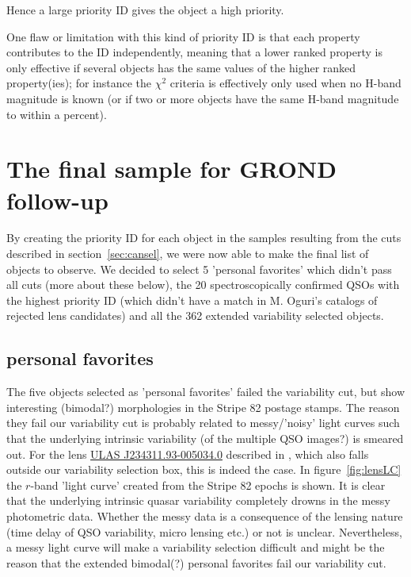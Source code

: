 \documentclass[a4paper,11pt]{article}
\begin{document}
Hence a large priority ID gives the object a high priority.

One flaw or limitation with this kind of priority ID is that each property
contributes to the ID independently, meaning that a lower ranked property is
only effective if several objects has the same values of the higher ranked
property(ies); for instance the $\chi^2$ criteria is effectively only used
when no H-band magnitude is known (or if two or more objects have the same
H-band magnitude to within a percent).

\section{The final sample for GROND follow-up}

By creating the priority ID for each object in the samples resulting from the cuts described in section~\ref{sec:cansel}, we were now able to make the final list of objects to observe. We decided to select 5 'personal favorites' which didn't pass all cuts (more about these below), the 20 spectroscopically confirmed QSOs with the highest priority ID (which didn't have a match in M. Oguri's catalogs of rejected lens candidates) and all the 362 extended variability selected objects.

\subsection{personal favorites}\label{sec:PF}
The five objects selected as 'personal favorites' failed the variability cut,
but  show interesting (bimodal?) morphologies in the Stripe 82 postage stamps.
The reason they fail our variability cut is probably related to messy/'noisy'
light curves such that the underlying intrinsic variability (of the multiple
QSO images?) is smeared out. For the lens
\href{http://casjobs.sdss.org/dr7/en/tools/explore/obj.asp?id=587731185128308933}{ULAS
J234311.93-005034.0} described in \cite{jackson08}, which also falls outside
our variability selection box, this is indeed the case. In
figure~\ref{fig:lensLC}  the $r$-band 'light curve' created from the Stripe 82
epochs is shown. It is clear that the underlying intrinsic quasar variability
completely drowns in the messy photometric data. Whether the messy data is a
consequence of the lensing nature (time delay of QSO variability, micro
lensing etc.) or not is unclear. Nevertheless, a messy light curve will make a
variability selection difficult and might be the reason that the extended
bimodal(?) personal favorites fail our variability cut.
\end{document}
